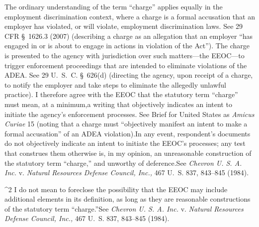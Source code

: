   The ordinary understanding of the term ``charge'' applies equally
in the employment discrimination context, where a charge is a formal
accusation that an employer has violated, or will violate, employment
discrimination laws. See 29 CFR \S~1626.3 (2007) (describing a
charge as an allegation that an employer ``has engaged in or is
about to engage in actions in violation of the Act''). The charge
is presented to the agency with jurisdiction over such matters---the
EEOC---to trigger enforcement proceedings that are intended to eliminate
violations of the ADEA. See 29 U.~S.~C. \S~626(d) (directing the
agency, upon receipt of a charge, to notify the employer and take steps
to eliminate the allegedly unlawful practice). I therefore agree
with the EEOC that the statutory term ``charge'' must mean, at a
minimum,\footnotemark[2] a writing that objectively indicates an intent to initiate
the agency's enforcement processes. See Brief for United States as
\emph{Amicus Curiae} 15 (noting that a charge must ``objectively manifest
an intent to make a formal accusation'' of an ADEA violation).\footnotemark[3]
In any event, respondent's documents do not \newpage  objectively
indicate an intent to initiate the EEOC's processes; any test that
construes them otherwise is, in my opinion, an unreasonable construction
of the statutory term ``charge,'' and unworthy of deference.See
\emph{Chevron U. S. A. Inc.} v. \emph{Natural Resources Defense Council,
Inc.,} 467 U.~S. 837, 843--845 (1984).


^2 I do not mean to foreclose the possibility that the EEOC may include
additional elements in its definition, as long as they are reasonable
constructions of the statutory term ``charge.''See \emph{Chevron U. S.
A. Inc.} v. \emph{Natural Resources Defense Council, Inc.,} 467 U.~S.
837, 843--845 (1984).

